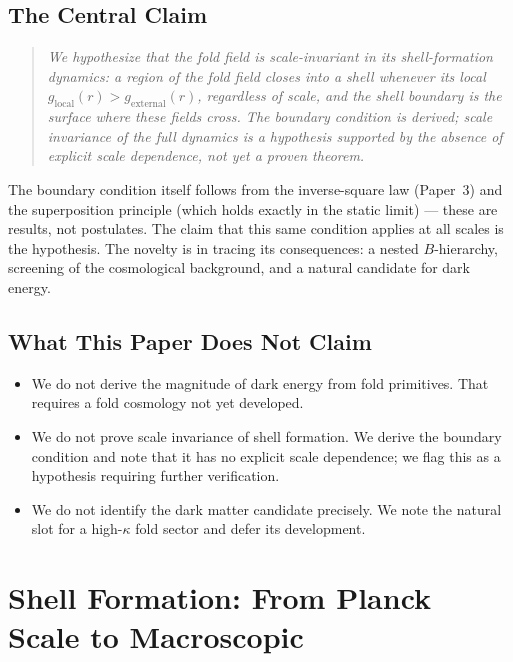 \documentclass[12pt]{article}
\begin{document}
\subsection{The Central Claim}

\begin{quote}
\textit{We hypothesize that the fold field is scale-invariant in
its shell-formation dynamics: a region of the fold field closes
into a shell whenever its local $g_{\mathrm{local}}(r) >
g_{\mathrm{external}}(r)$, regardless of scale, and the shell
boundary is the surface where these fields cross.
The boundary condition is derived; scale invariance of the
full dynamics is a hypothesis supported by the absence of
explicit scale dependence, not yet a proven theorem.}
\end{quote}

The boundary condition itself follows from the inverse-square law
(Paper~3) and the superposition principle (which holds exactly in
the static limit) --- these are results, not postulates.
The claim that this same condition applies at all scales is the
hypothesis. The novelty is in tracing its consequences: a nested
$B$-hierarchy, screening of the cosmological background, and a
natural candidate for dark energy.

\subsection{What This Paper Does Not Claim}

\begin{itemize}
  \item We do not derive the magnitude of dark energy from fold primitives.
        That requires a fold cosmology not yet developed.
  \item We do not prove scale invariance of shell formation.
        We derive the boundary condition and note that it has no
        explicit scale dependence; we flag this as a hypothesis
        requiring further verification.
  \item We do not identify the dark matter candidate precisely.
        We note the natural slot for a high-$\kappa$ fold sector and
        defer its development.
\end{itemize}

\section{Shell Formation: From Planck Scale to Macroscopic}
\end{document}
